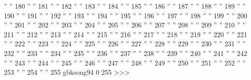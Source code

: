 '' ''         180
'' ''         181
'' ''         182
'' ''         183
'' ''         184
'' ''         185
'' ''         186
'' ''         187
'' ''         188
'' ''         189
'' ''         190
'' ''         191
'' ''         192
'' ''         193
'' ''         194
'' ''         195
'' ''         196
'' ''         197
'' ''         198
'' ''         199
'' ''         200
'' ''         201
'' ''         202
'' ''         203
'' ''         204
'' ''         205
'' ''         206
'' ''         207
'' ''         208
'' ''         209
'' ''         210
'' ''         211
'' ''         212
'' ''         213
'' ''         214
'' ''         215
'' ''         216
'' ''         217
'' ''         218
'' ''         219
'' ''         220
'' ''         221
'' ''         222
'' ''         223
'' ''         224
'' ''         225
'' ''         226
'' ''         227
'' ''         228
'' ''         229
'' ''         230
'' ''         231
'' ''         232
'' ''         233
'' ''         234
'' ''         235
'' ''         236
'' ''         237
'' ''         238
'' ''         239
'' ''         240
'' ''         241
'' ''         242
'' ''         243
'' ''         244
'' ''         245
'' ''         246
'' ''         247
'' ''         248
'' ''         249
'' ''         250
'' ''         251
'' ''         252
'' ''         253
'' ''         254
'' ''         255
gbksong94 0 255
>>>






\def\EndCJK{%
   \CloseCode
   \Configure{charset}{charset=iso-8859-1}
}



\def\GbkAlias#1#2{%
     \def\CURR{#1\ifnum\GBK<10 0\fi\GBK}
     \immediate\write\dbcs{\string\<\CURR\string\><<<}
     \immediate\write\dbcs{.gbksong\ifnum\GBK<10 0\fi\GBK}
     \immediate\write\dbcs{#2}
     \immediate\write\dbcs{>>>   
     \string\AddFont{\CURR}{alias/gbk/#1/\CURR}}
  \ifnum \GBK<94
    \HAdvance\GBK by 1 
    \def\next{\GbkAlias{#1}{#2}}%
    \expandafter\next
  \fi 
 }



